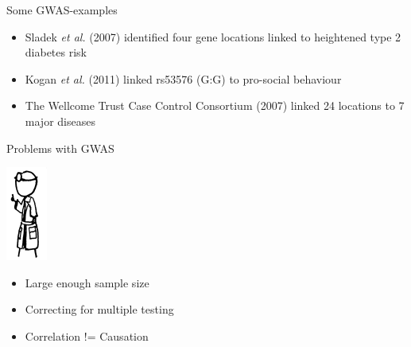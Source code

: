 \documentclass[12pt,a4paper]{beamer}
\begin{document}
\begin{frame}{Some GWAS-examples}
\begin{itemize}
\item Sladek \textit{et al.} (2007) identified four gene locations linked to heightened type 2 diabetes risk
\pause \item Kogan \textit{et al.} (2011) linked rs53576 (G:G) to pro-social behaviour
\pause \item The Wellcome Trust Case Control Consortium (2007) linked 24 locations to 7 major diseases 
\end{itemize}
\end{frame}

\begin{frame}{Problems with GWAS}
\begin{flushright}
\includegraphics[scale=0.5]{doctor_xkcd.png} \\
\end{flushright}
\begin{itemize}
\item Large enough sample size
\pause \item Correcting for multiple testing
\pause \item Correlation != Causation
\end{itemize}
\end{frame}
\end{document}
